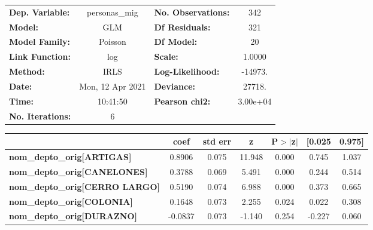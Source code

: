 \begin{center}
\begin{tabular}{lclc}
\toprule
\textbf{Dep. Variable:}                   &  personas\_mig   & \textbf{  No. Observations:  } &      342    \\
\textbf{Model:}                           &       GLM        & \textbf{  Df Residuals:      } &      321    \\
\textbf{Model Family:}                    &     Poisson      & \textbf{  Df Model:          } &       20    \\
\textbf{Link Function:}                   &       log        & \textbf{  Scale:             } &    1.0000   \\
\textbf{Method:}                          &       IRLS       & \textbf{  Log-Likelihood:    } &   -14973.   \\
\textbf{Date:}                            & Mon, 12 Apr 2021 & \textbf{  Deviance:          } &    27718.   \\
\textbf{Time:}                            &     10:41:50     & \textbf{  Pearson chi2:      } &  3.00e+04   \\
\textbf{No. Iterations:}                  &        6         & \textbf{                     } &             \\
\bottomrule
\end{tabular}
\begin{tabular}{lcccccc}
                                          & \textbf{coef} & \textbf{std err} & \textbf{z} & \textbf{P$> |$z$|$} & \textbf{[0.025} & \textbf{0.975]}  \\
\midrule
\textbf{nom\_depto\_orig[ARTIGAS]}        &       0.8906  &        0.075     &    11.948  &         0.000        &        0.745    &        1.037     \\
\textbf{nom\_depto\_orig[CANELONES]}      &       0.3788  &        0.069     &     5.491  &         0.000        &        0.244    &        0.514     \\
\textbf{nom\_depto\_orig[CERRO LARGO]}    &       0.5190  &        0.074     &     6.988  &         0.000        &        0.373    &        0.665     \\
\textbf{nom\_depto\_orig[COLONIA]}        &       0.1648  &        0.073     &     2.255  &         0.024        &        0.022    &        0.308     \\
\textbf{nom\_depto\_orig[DURAZNO]}        &      -0.0837  &        0.073     &    -1.140  &         0.254        &       -0.227    &        0.060     \\

\end{tabular}
\end{center}

